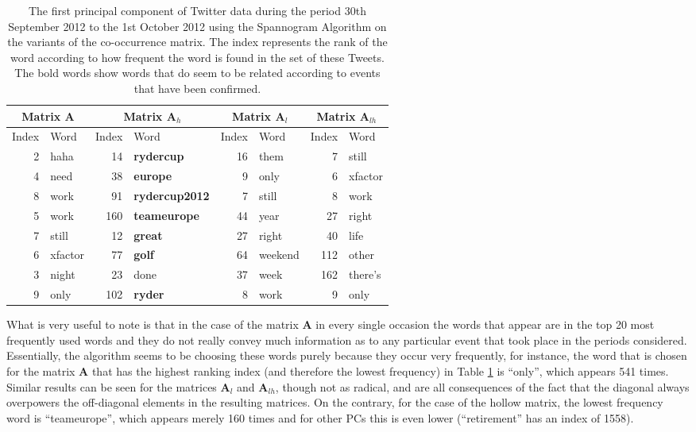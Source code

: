 \documentclass[graybox]{svmult}
\newcommand{\covmat}{\mathbf{A}}
\begin{document}
\begin{table}[H]
\center
\begin{tabular}{| r | l | r | l| r | l | r | l|}
\hline
\multicolumn{2}{|c|}{Matrix $\covmat$ }& \multicolumn{2}{|c|}{Matrix $\covmat_h$}& \multicolumn{2}{|c|}{Matrix $\covmat_l$} & \multicolumn{2}{|c|}{Matrix $\covmat_{lh}$} \\

\hline
Index & Word &Index & Word & Index & Word & Index & Word\\
\hline
2 & haha & 14 & \textbf{rydercup} & 16 & them& 7 & still\\
4 & need  & 38 & \textbf{europe} & 9 & only &  6 & xfactor\\
8 & work &91 & \textbf{rydercup2012}& 7 & still  & 8 & work \\

5 & work & 160 & \textbf{teameurope}&44 & year  & 27 & right \\

7 & still &  12 & \textbf{great}&27 & right   & 40 & life\\

6 & xfactor & 77 & \textbf{golf}  &64& weekend & 112 & other  \\ 

3 & night &23 & done & 37 & week & 162 & there's\\
 
9 & only & 102 & \textbf{ryder}  & 8 & work & 9 & only\\

\hline
\end{tabular}
\label{pcs_ryder}
\caption{The first principal component of Twitter data during the period 30th September 2012 to the 1st October 2012 using the Spannogram Algorithm on the variants of the co-occurrence matrix. The index represents the rank of the word according to how frequent the word is found in the set of these Tweets. The bold words show words that do seem to be related according to events that have been confirmed.}
\end{table}


What is very useful to note is that in the case of the matrix $\covmat$ in every single occasion the words that appear are in the top 20 most frequently used words and they do not really convey much information as to any particular event that took place in the periods considered. Essentially, the algorithm seems to be choosing these words purely because they occur very frequently, for instance, the word that is chosen for the matrix $\covmat$ that has the highest ranking index (and therefore the lowest frequency) in Table \ref{pcs_ryder} is ``only'', which appears 541 times. Similar results can be seen for the matrices $\covmat_l$ and $\covmat_{lh}$, though not as radical, and are all consequences of the fact that the diagonal always overpowers the off-diagonal elements in the resulting matrices. On the contrary, for the case of the hollow matrix, the lowest frequency word is ``teameurope'', which appears merely 160 times and for other PCs this is even lower (``retirement'' has an index of 1558). 
\end{document}
